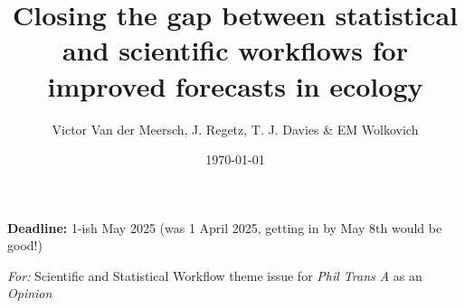 \documentclass[11pt]{article}
\begin{document}
\title{Closing the gap between statistical and scientific workflows for improved forecasts in ecology } 
\date{\today}
\author{Victor Van der Meersch, J. Regetz, T. J. Davies \& EM Wolkovich}
\maketitle

{\bf Deadline:} 1-ish May 2025 (was 1 April 2025, getting in by May 8th would be good!)

\emph{For:} Scientific and Statistical Workflow theme issue for \emph{Phil Trans A} as an \emph{Opinion}
\end{document}
